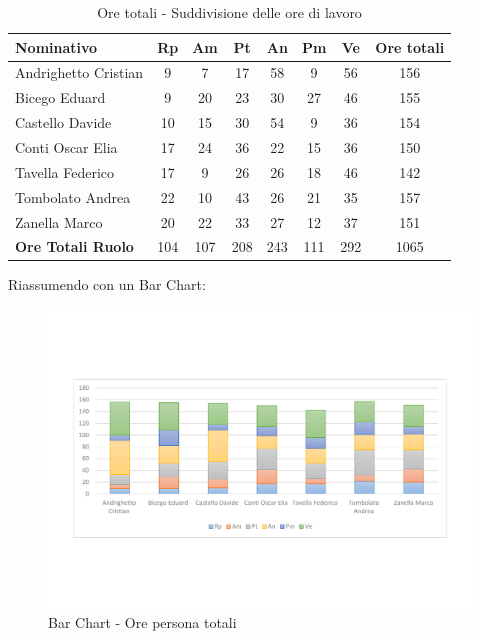 \documentclass[../PianoProgetto.tex]{subfiles}
\begin{document}
	\begin{table}[h]
		\begin{tabularx}{\textwidth}{l  * {6}{C}  c}
			\toprule
			\textbf{Nominativo} & \textbf{Rp} & \textbf{Am} & \textbf{Pt} 
						& \textbf{An} & \textbf{Pm} & \textbf{Ve} & \textbf{Ore totali} \\
			\midrule
			Andrighetto Cristian & 9 & 7 & 17 & 58 & 9 & 56 &	156 \\
			Bicego Eduard & 9 & 20 & 23 & 30 & 27 & 46 & 155 \\
			Castello Davide & 10 & 15 & 30 & 54 & 9 & 36 & 154 \\
			Conti Oscar Elia & 17 & 24 & 36 & 22 & 15 & 36 & 150 \\
			Tavella Federico &	17 & 9 & 26 & 26 & 18 & 46 & 142 \\
			Tombolato Andrea & 22 & 10 & 43 & 26 & 21 & 35 & 157 \\
			Zanella Marco & 20 & 22 & 33 & 27 & 12 & 37 & 151 \\
			\midrule			
			\textbf{Ore Totali Ruolo} & 104 & 107 & 208 & 243 & 111 & 292 & 1065 \\
			\bottomrule
		\end{tabularx}
		\caption{Ore totali - Suddivisione delle ore di lavoro}
		\label{tab:totale_ore}
	\end{table}
	
\newpage
\vfill
	Riassumendo con un Bar Chart:
	
	\begin{figure}[!h]
		\centering
		\includegraphics[width=\textwidth , trim=2cm 5cm 2cm 5cm]{grafici/Riepilogo/Totali/ore-persona}
			\caption{Bar Chart - Ore persona totali}
		\label{fig:BarChart-totale_ore}
	\end{figure}
	
\end{document}
